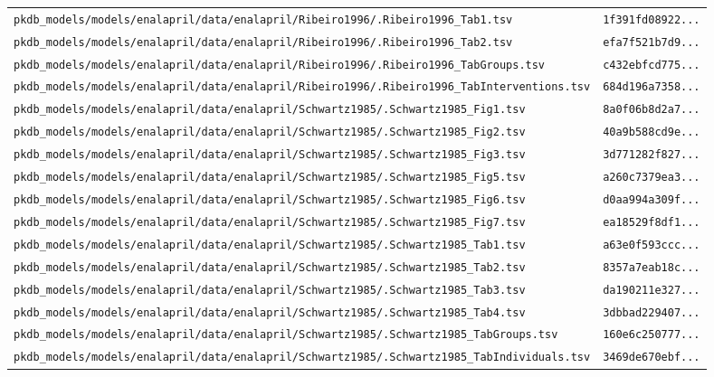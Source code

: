\documentclass{article}
\begin{document}
\begin{longtable}{ll}
\texttt{pkdb\_models/models/enalapril/data/enalapril/Ribeiro1996/.Ribeiro1996\_Tab1.tsv} & \texttt{1f391fd08922...} \\
\texttt{pkdb\_models/models/enalapril/data/enalapril/Ribeiro1996/.Ribeiro1996\_Tab2.tsv} & \texttt{efa7f521b7d9...} \\
\texttt{pkdb\_models/models/enalapril/data/enalapril/Ribeiro1996/.Ribeiro1996\_TabGroups.tsv} & \texttt{c432ebfcd775...} \\
\texttt{pkdb\_models/models/enalapril/data/enalapril/Ribeiro1996/.Ribeiro1996\_TabInterventions.tsv} & \texttt{684d196a7358...} \\
\texttt{pkdb\_models/models/enalapril/data/enalapril/Schwartz1985/.Schwartz1985\_Fig1.tsv} & \texttt{8a0f06b8d2a7...} \\
\texttt{pkdb\_models/models/enalapril/data/enalapril/Schwartz1985/.Schwartz1985\_Fig2.tsv} & \texttt{40a9b588cd9e...} \\
\texttt{pkdb\_models/models/enalapril/data/enalapril/Schwartz1985/.Schwartz1985\_Fig3.tsv} & \texttt{3d771282f827...} \\
\texttt{pkdb\_models/models/enalapril/data/enalapril/Schwartz1985/.Schwartz1985\_Fig5.tsv} & \texttt{a260c7379ea3...} \\
\texttt{pkdb\_models/models/enalapril/data/enalapril/Schwartz1985/.Schwartz1985\_Fig6.tsv} & \texttt{d0aa994a309f...} \\
\texttt{pkdb\_models/models/enalapril/data/enalapril/Schwartz1985/.Schwartz1985\_Fig7.tsv} & \texttt{ea18529f8df1...} \\
\texttt{pkdb\_models/models/enalapril/data/enalapril/Schwartz1985/.Schwartz1985\_Tab1.tsv} & \texttt{a63e0f593ccc...} \\
\texttt{pkdb\_models/models/enalapril/data/enalapril/Schwartz1985/.Schwartz1985\_Tab2.tsv} & \texttt{8357a7eab18c...} \\
\texttt{pkdb\_models/models/enalapril/data/enalapril/Schwartz1985/.Schwartz1985\_Tab3.tsv} & \texttt{da190211e327...} \\
\texttt{pkdb\_models/models/enalapril/data/enalapril/Schwartz1985/.Schwartz1985\_Tab4.tsv} & \texttt{3dbbad229407...} \\
\texttt{pkdb\_models/models/enalapril/data/enalapril/Schwartz1985/.Schwartz1985\_TabGroups.tsv} & \texttt{160e6c250777...} \\
\texttt{pkdb\_models/models/enalapril/data/enalapril/Schwartz1985/.Schwartz1985\_TabIndividuals.tsv} & \texttt{3469de670ebf...} \\

\end{longtable}
\end{document}
